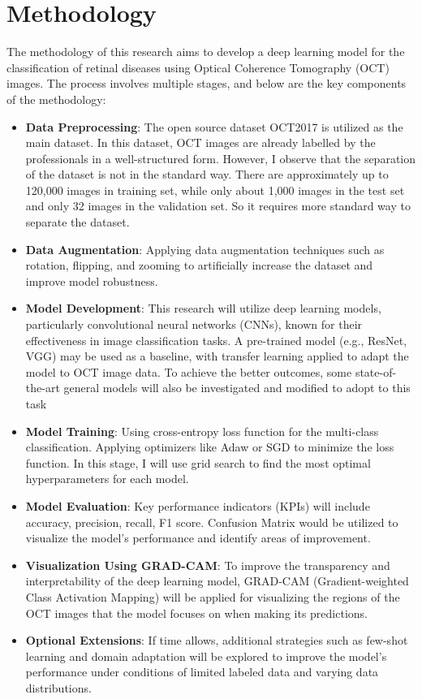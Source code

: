 \documentclass[a4paper,12pt]{article}
\begin{document}
\section*{Methodology}
The methodology of this research aims to develop a deep learning model for the classification of retinal diseases using Optical Coherence Tomography (OCT) images. The process involves multiple stages, and below are the key components of the methodology:
\begin{itemize}
    \item \textbf{Data Preprocessing}: The open source dataset OCT2017 is utilized as the main dataset. In this dataset, OCT images are already labelled by the professionals in a well-structured form. However, I observe that the separation of the dataset is not in the standard way. There are approximately up to 120,000 images in training set, while only about 1,000 images in the test set and only 32 images in the validation set. So it requires more standard way to separate the dataset.
    \item \textbf{Data Augmentation}: Applying data augmentation techniques such as rotation, flipping, and zooming to artificially increase the dataset and improve model robustness.
    \item \textbf{Model Development}: This research will utilize deep learning models, particularly convolutional neural networks (CNNs), known for their effectiveness in image classification tasks. A pre-trained model (e.g., ResNet, VGG) may be used as a baseline, with transfer learning applied to adapt the model to OCT image data. To achieve the better outcomes, some state-of-the-art general models will also be investigated and modified to adopt to this task
    \item \textbf{Model Training}: Using cross-entropy loss function for the multi-class classification. Applying optimizers like Adaw or SGD to minimize the loss function. In this stage, I will use grid search to find the most optimal hyperparameters for each model.
    \item \textbf{Model Evaluation}: Key performance indicators (KPIs) will include accuracy, precision, recall, F1 score. Confusion Matrix would be utilized to visualize the model's performance and identify areas of improvement.
    \item \textbf{Visualization Using GRAD-CAM}: To improve the transparency and interpretability of the deep learning model, GRAD-CAM (Gradient-weighted Class Activation Mapping) will be applied for visualizing the regions of the OCT images that the model focuses on when making its predictions. 
    \item \textbf{Optional Extensions}: If time allows, additional strategies such as few-shot learning and domain adaptation will be explored to improve the model’s performance under conditions of limited labeled data and varying data distributions.
\end{itemize}
\end{document}
